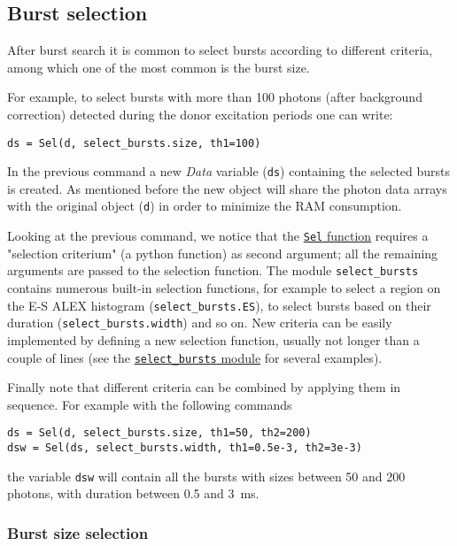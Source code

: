 \subsection{Burst selection}
\label{sec:burstsel}

After burst search it is common to select bursts according to different
criteria, among which one of the most common is the burst size.

For example, to select bursts with more than 100 photons (after background
correction) detected during the donor excitation periods one can write:

\begin{verbatim}
ds = Sel(d, select_bursts.size, th1=100)
\end{verbatim}

In the previous command a new \textit{Data} variable (\verb|ds|) containing the selected
bursts is created. As mentioned before the new object will share the photon data
arrays with the original object (\verb|d|) in order to minimize the RAM
consumption.

Looking at the previous command, we notice that the
\href{http://fretbursts.readthedocs.org/en/latest/burst\_selection.html#fretbursts.burstlib.Sel}{\texttt{Sel} function}
requires a "selection criterium" (a python function) as second
argument; all the remaining arguments are passed to the selection function. The
module \verb|select_bursts| contains numerous built-in selection functions, for
example to
select a region on the E-S ALEX histogram (\verb|select_bursts.ES|), 
to select bursts based on their duration (\verb|select_bursts.width|) and so on.
New criteria can be easily 
implemented by defining a new selection function, usually not longer than a
couple of lines (see the
\href{https://github.com/tritemio/FRETBursts/blob/master/fretbursts/select\_bursts.py}{\texttt{select\_bursts} module} for several examples).

Finally note that different criteria can be combined by applying them
in sequence. For example with the following commands

\begin{verbatim}
ds = Sel(d, select_bursts.size, th1=50, th2=200)
dsw = Sel(ds, select_bursts.width, th1=0.5e-3, th2=3e-3)
\end{verbatim}

the variable \verb|dsw| will contain all the bursts with sizes between 50 and
200 photons, with duration between 0.5 and 3~ms.

\subsubsection{Burst size selection}

